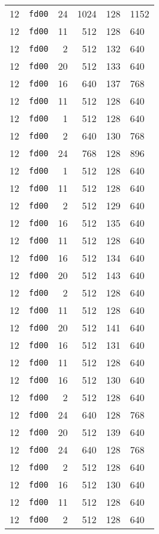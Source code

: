 \documentclass{article}
\begin{document}
\begin{table}[h!]
\begin{tabular}{llrrrl}
    12 & \texttt{fd00} & 24 & 1024 & 128 & 1152 \\
    12 & \texttt{fd00} & 11 & 512 & 128 & 640 \\
    12 & \texttt{fd00} & 2 & 512 & 132 & 640 \\
    12 & \texttt{fd00} & 20 & 512 & 133 & 640 \\
    12 & \texttt{fd00} & 16 & 640 & 137 & 768 \\
    12 & \texttt{fd00} & 11 & 512 & 128 & 640 \\
    12 & \texttt{fd00} & 1 & 512 & 128 & 640 \\
    12 & \texttt{fd00} & 2 & 640 & 130 & 768 \\
    12 & \texttt{fd00} & 24 & 768 & 128 & 896 \\
    12 & \texttt{fd00} & 1 & 512 & 128 & 640 \\
    12 & \texttt{fd00} & 11 & 512 & 128 & 640 \\
    12 & \texttt{fd00} & 2 & 512 & 129 & 640 \\
    12 & \texttt{fd00} & 16 & 512 & 135 & 640 \\
    12 & \texttt{fd00} & 11 & 512 & 128 & 640 \\
    12 & \texttt{fd00} & 16 & 512 & 134 & 640 \\
    12 & \texttt{fd00} & 20 & 512 & 143 & 640 \\
    12 & \texttt{fd00} & 2 & 512 & 128 & 640 \\
    12 & \texttt{fd00} & 11 & 512 & 128 & 640 \\
    12 & \texttt{fd00} & 20 & 512 & 141 & 640 \\
    12 & \texttt{fd00} & 16 & 512 & 131 & 640 \\
    12 & \texttt{fd00} & 11 & 512 & 128 & 640 \\
    12 & \texttt{fd00} & 16 & 512 & 130 & 640 \\
    12 & \texttt{fd00} & 2 & 512 & 128 & 640 \\
    12 & \texttt{fd00} & 24 & 640 & 128 & 768 \\
    12 & \texttt{fd00} & 20 & 512 & 139 & 640 \\
    12 & \texttt{fd00} & 24 & 640 & 128 & 768 \\
    12 & \texttt{fd00} & 2 & 512 & 128 & 640 \\
    12 & \texttt{fd00} & 16 & 512 & 130 & 640 \\
    12 & \texttt{fd00} & 11 & 512 & 128 & 640 \\
    12 & \texttt{fd00} & 2 & 512 & 128 & 640 \\

\end{tabular}
\end{table}
\end{document}
